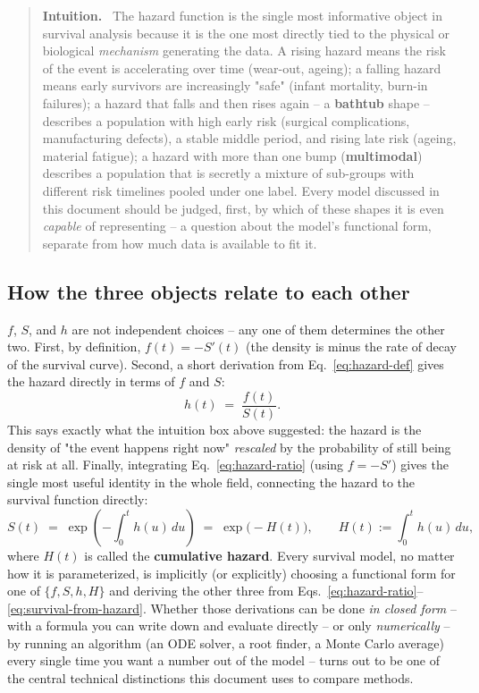 \documentclass[11pt]{article}
\newenvironment{intuition}
  {\par\addvspace{8pt}\begin{quote}\noindent\textbf{\textcolor{blue!40!black}{Intuition.}}\ }
  {\end{quote}\par\addvspace{8pt}}
\begin{document}
\begin{intuition}
The hazard function is the single most informative object in survival
analysis because it is the one most directly tied to the physical or
biological \emph{mechanism} generating the data. A rising hazard means
the risk of the event is accelerating over time (wear-out, ageing); a
falling hazard means early survivors are increasingly "safe" (infant
mortality, burn-in failures); a hazard that falls and then rises again
-- a \textbf{bathtub} shape -- describes a population with high early
risk (surgical complications, manufacturing defects), a stable middle
period, and rising late risk (ageing, material fatigue); a hazard with
more than one bump (\textbf{multimodal}) describes a population that is
secretly a mixture of sub-groups with different risk timelines pooled
under one label. Every model discussed in this document should be judged,
first, by which of these shapes it is even \emph{capable} of representing
-- a question about the model's functional form, separate from how much
data is available to fit it.
\end{intuition}

\subsection{How the three objects relate to each other}

$f$, $S$, and $h$ are not independent choices -- any one of them
determines the other two. First, by definition, $f(t) = -S'(t)$ (the
density is minus the rate of decay of the survival curve). Second, a short
derivation from Eq.~\eqref{eq:hazard-def} gives the hazard directly in
terms of $f$ and $S$:
\begin{equation}
  h(t) \;=\; \frac{f(t)}{S(t)}.
  \label{eq:hazard-ratio}
\end{equation}
This says exactly what the intuition box above suggested: the hazard is
the density of "the event happens right now" \emph{rescaled} by the
probability of still being at risk at all. Finally, integrating
Eq.~\eqref{eq:hazard-ratio} (using $f = -S'$) gives the single most
useful identity in the whole field, connecting the hazard to the survival
function directly:
\begin{equation}
  S(t) \;=\; \exp\!\left(-\int_0^t h(u)\,du\right) \;=\; \exp\bigl(-H(t)\bigr),
  \qquad H(t) := \int_0^t h(u)\,du,
  \label{eq:survival-from-hazard}
\end{equation}
where $H(t)$ is called the \textbf{cumulative hazard}. Every survival
model, no matter how it is parameterized, is implicitly (or explicitly)
choosing a functional form for one of $\{f, S, h, H\}$ and deriving the
other three from Eqs.~\eqref{eq:hazard-ratio}--\eqref{eq:survival-from-hazard}.
Whether those derivations can be done \emph{in closed form} -- with a
formula you can write down and evaluate directly -- or only
\emph{numerically} -- by running an algorithm (an ODE solver, a root
finder, a Monte Carlo average) every single time you want a number out of
the model -- turns out to be one of the central technical distinctions
this document uses to compare methods.
\end{document}
